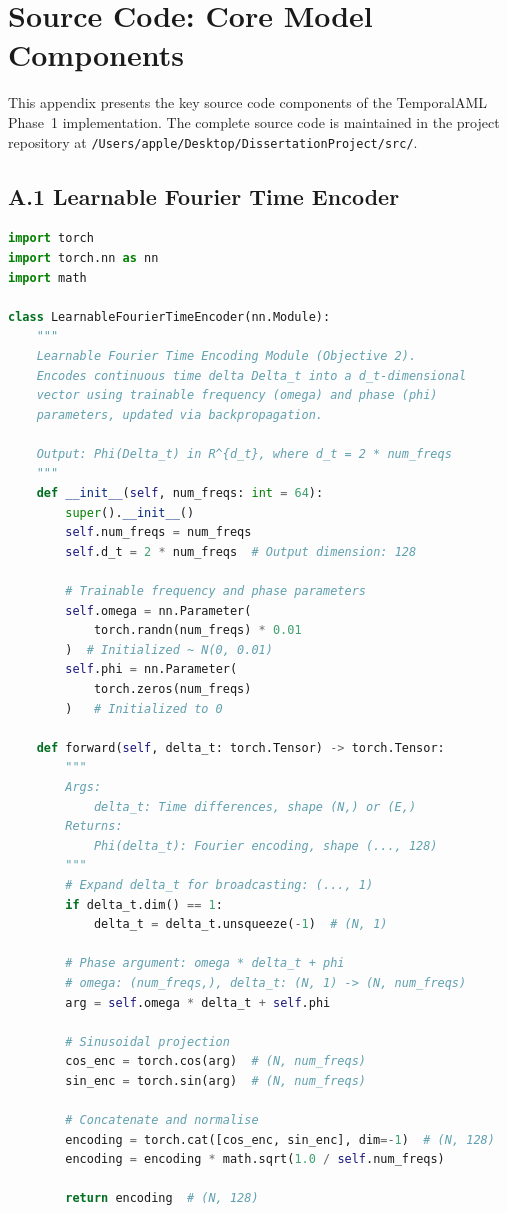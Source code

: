\chapter{Source Code: Core Model Components}
\label{AppendixA}

This appendix presents the key source code components of the TemporalAML Phase~1 implementation. The complete source code is maintained in the project repository at \texttt{/Users/apple/Desktop/DissertationProject/src/}.

\section*{A.1 Learnable Fourier Time Encoder}

\begin{lstlisting}[language=Python, caption={LearnableFourierTimeEncoder: Core implementation of the trainable Fourier time encoding module (src/models.py).}, label={lst:fourier_encoder}]
import torch
import torch.nn as nn
import math

class LearnableFourierTimeEncoder(nn.Module):
    """
    Learnable Fourier Time Encoding Module (Objective 2).
    Encodes continuous time delta Delta_t into a d_t-dimensional
    vector using trainable frequency (omega) and phase (phi)
    parameters, updated via backpropagation.
    
    Output: Phi(Delta_t) in R^{d_t}, where d_t = 2 * num_freqs
    """
    def __init__(self, num_freqs: int = 64):
        super().__init__()
        self.num_freqs = num_freqs
        self.d_t = 2 * num_freqs  # Output dimension: 128
        
        # Trainable frequency and phase parameters
        self.omega = nn.Parameter(
            torch.randn(num_freqs) * 0.01
        )  # Initialized ~ N(0, 0.01)
        self.phi = nn.Parameter(
            torch.zeros(num_freqs)
        )   # Initialized to 0
    
    def forward(self, delta_t: torch.Tensor) -> torch.Tensor:
        """
        Args:
            delta_t: Time differences, shape (N,) or (E,)
        Returns:
            Phi(delta_t): Fourier encoding, shape (..., 128)
        """
        # Expand delta_t for broadcasting: (..., 1)
        if delta_t.dim() == 1:
            delta_t = delta_t.unsqueeze(-1)  # (N, 1)
        
        # Phase argument: omega * delta_t + phi
        # omega: (num_freqs,), delta_t: (N, 1) -> (N, num_freqs)
        arg = self.omega * delta_t + self.phi
        
        # Sinusoidal projection
        cos_enc = torch.cos(arg)  # (N, num_freqs)
        sin_enc = torch.sin(arg)  # (N, num_freqs)
        
        # Concatenate and normalise
        encoding = torch.cat([cos_enc, sin_enc], dim=-1)  # (N, 128)
        encoding = encoding * math.sqrt(1.0 / self.num_freqs)
        
        return encoding  # (N, 128)
\end{lstlisting}

